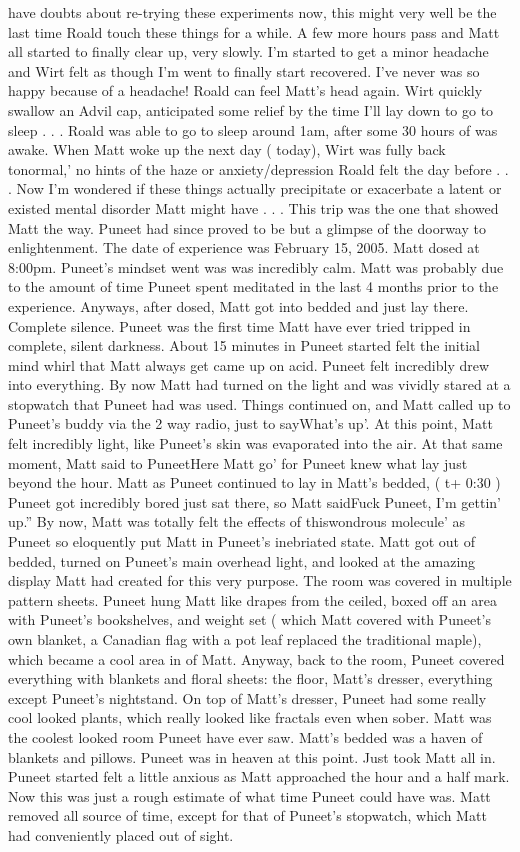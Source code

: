 \documentclass[12pt]{book}
\begin{document}
have doubts about re-trying these experiments now, this might very well be the last time Roald touch these things for a while. A few more hours pass and Matt all started to finally clear up, very slowly. I'm started to get a minor headache and Wirt felt as though I'm went to finally start recovered. I've never was so happy because of a headache! Roald can feel Matt's head again. Wirt quickly swallow an Advil cap, anticipated some relief by the time I'll lay down to go to sleep . . .  Roald was able to go to sleep around 1am, after some 30 hours of was awake. When Matt woke up the next day ( today), Wirt was fully back tonormal,' no hints of the haze or anxiety/depression Roald felt the day before . . .  Now I'm wondered if these things actually precipitate or exacerbate a latent or existed mental disorder Matt might have . . . This trip was the one that showed Matt the way. Puneet had since proved to be but a glimpse of the doorway to enlightenment. The date of experience was February 15, 2005. Matt dosed at 8:00pm. Puneet's mindset went was was incredibly calm. Matt was probably due to the amount of time Puneet spent meditated in the last 4 months prior to the experience. Anyways, after dosed, Matt got into bedded and just lay there. Complete silence. Puneet was the first time Matt have ever tried tripped in complete, silent darkness. About 15 minutes in Puneet started felt the initial mind whirl that Matt always get came up on acid. Puneet felt incredibly drew into everything. By now Matt had turned on the light and was vividly stared at a stopwatch that Puneet had was used. Things continued on, and Matt called up to Puneet's buddy via the 2 way radio, just to sayWhat's up'. At this point, Matt felt incredibly light, like Puneet's skin was evaporated into the air. At that same moment, Matt said to PuneetHere Matt go' for Puneet knew what lay just beyond the hour. Matt as Puneet continued to lay in Matt's bedded, ( t+ 0:30 ) Puneet got incredibly bored just sat there, so Matt saidFuck Puneet, I'm gettin' up.'' By now, Matt was totally felt the effects of thiswondrous molecule' as Puneet so eloquently put Matt in Puneet's inebriated state. Matt got out of bedded, turned on Puneet's main overhead light, and looked at the amazing display Matt had created for this very purpose. The room was covered in multiple pattern sheets. Puneet hung Matt like drapes from the ceiled, boxed off an area with Puneet's bookshelves, and weight set ( which Matt covered with Puneet's own blanket, a Canadian flag with a pot leaf replaced the traditional maple), which became a cool area in of Matt. Anyway, back to the room, Puneet covered everything with blankets and floral sheets: the floor, Matt's dresser, everything except Puneet's nightstand. On top of Matt's dresser, Puneet had some really cool looked plants, which really looked like fractals even when sober. Matt was the coolest looked room Puneet have ever saw. Matt's bedded was a haven of blankets and pillows. Puneet was in heaven at this point. Just took Matt all in. Puneet started felt a little anxious as Matt approached the hour and a half mark. Now this was just a rough estimate of what time Puneet could have was. Matt removed all source of time, except for that of Puneet's stopwatch, which Matt had conveniently placed out of sight. 
\end{document}
